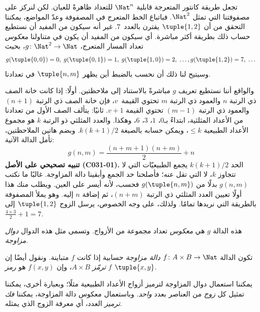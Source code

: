 \documentclass[../../../include/open-logic-section]{subfiles}
\begin{document}

\begin{explain}
تجعل طريقة كانتور المتعرجة قابلية $\Nat^n$ للتعداد ظاهرةً للعيان.
لكن لنركز على مصفوفتنا التي تمثل $\Nat^2$. فباتباع الخط المتعرج في
المصفوفة وعدّ المواضع، يمكننا التحقق من أن $\tuple{1,2}$ يقترن
بالعدد~$7$. غير أنه سيكون من المفيد أن نستطيع حساب ذلك بطريقة
أكثر مباشرة. أي سيكون من المفيد أن يكون في متناولنا \emph{معكوس}
تعداد المسار المتعرج، $g\colon \Nat^2 \to \Nat$، بحيث
\[
g(\tuple{0,0}) = 0, \;
g(\tuple{0,1}) = 1, \;
g(\tuple{1,0}) = 2, \; \dots,
g(\tuple{1,2}) = 7, \; \dots
\]
وسيتيح لنا ذلك أن نحسب بالضبط أين يظهر $\tuple{n, m}$ في تعدادنا.

والواقع أننا نستطيع تعريف $g$ مباشرةً بالاستناد إلى ملاحظتين. أولًا:
إذا كانت خانة الصف ذي الرتبة $n$ والعمود ذي الرتبة $m$ تحتوي
القيمة~$v$، فإن خانة الصف ذي الرتبة $(n+1)$ والعمود ذي الرتبة
$(m-1)$ تحتوي القيمة $v + 1$. ثانيًا: يتألف الصف الأول من تعدادنا
من الأعداد المثلثية، ابتداءً بـ$0$، $1$، $3$، $6$، وهكذا. والعدد
المثلثي ذو الرتبة $k$ هو مجموع الأعداد الطبيعية $\leq k$، ويمكن حسابه
بالصيغة $k(k+1)/2$. وبضم هاتين الملاحظتين، تأمل الدالة الآتية:
\[
  g(n,m) = \frac{(n+m+1)(n+m)}{2} + n
\]
\textbf{تنبيه تصحيحي على الأصل (C031-01).} الحد $k(k+1)/2$ يجمع الطبيعيّات التي
لا تتجاوز $k$، لا التي تقل عنه؛ فأصلحنا حد الجمع وأبقينا دالة المزاوجة.
غالبًا ما نكتب $g(n, m)$ بدلًا من $g(\tuple{n, m})$ فحسب، لأنه أيسر
على العين. ويطلب منك هذا أولًا تعيين العدد المثلثي ذي الرتبة
$(n+m)$، ثم إضافة $n$ إليه. وهو يملأ المصفوفة بالطريقة
التي نريدها تمامًا. ولذلك، على وجه الخصوص، يرسل الزوج
$\tuple{1, 2}$ إلى $\frac{4 \times 3}{2} +
1 = 7$.

هذه الدالة $g$ هي \emph{معكوس} تعداد مجموعة من الأزواج. وتسمى مثل
هذه الدوال \emph{دوال مزاوجة}.
\end{explain}

\begin{defn}
  تكون الدالة $f\colon A \times B \to \Nat$ \emph{دالة مزاوجة}
  حسابية إذا كانت $f$ متباينة. ونقول أيضًا إن $f$ \emph{ترمّز}
  $A \times B$، وإن $f(x,y)$ هو \emph{رمز} $\tuple{x,y}$.
\end{defn}

\begin{explain}
يمكننا استعمال دوال المزاوجة لترميز أزواج الأعداد الطبيعية مثلًا؛
وبعبارة أخرى، يمكننا تمثيل كل \emph{زوج} من العناصر بعدد
\emph{واحد}. وباستعمال معكوس دالة المزاوجة، يمكننا \emph{فك ترميز}
العدد، أي معرفة الزوج الذي يمثله.
\end{explain}
\end{document}
